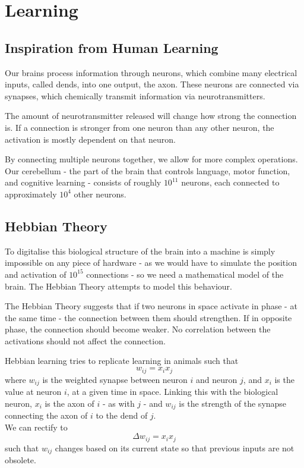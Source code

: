 \section{Learning} 

\subsection{Inspiration from Human Learning}
\label{human}

Our brains process information through \gls{neuron}s, which combine many electrical inputs, called \gls{dend}s, into one output, the \gls{axon}. These \gls{neuron}s are connected via \gls{synapse}s, which chemically transmit information via neurotransmitters. \cite{brain} 

The amount of neurotransmitter released will change how strong the connection is. If a connection is stronger from one \gls{neuron} than any other \gls{neuron}, the activation is mostly dependent on that \gls{neuron}. 

By connecting multiple \gls{neuron}s together, we allow for more complex operations. Our cerebellum - the part of the brain that controls language, motor function, and cognitive learning - consists of roughly $10^{11}$ \gls{neuron}s, each connected to approximately $10^4$ other \gls{neuron}s.\cite{neuron}

\subsection{Hebbian Theory}
\label{hebb}

To digitalise this biological structure of the brain into a machine is simply impossible on any piece of hardware - as we would have to simulate the position and activation of $10^{15}$ connections - so we need a mathematical \gls{model} of the brain. The Hebbian Theory attempts to \gls{model} this behaviour.

The Hebbian Theory suggests that if two \gls{neuron}s in space activate in phase - at the same time - the connection between them should strengthen. If in opposite phase, the connection should become weaker. No correlation between the activations should not affect the connection.\cite[p.~70]{hebb}

Hebbian learning tries to replicate learning in animals such that 
\begin{equation}
w_{ij}=x_ix_j 
\label{eq:hebb}
\end{equation}
where $w_{ij}$ is the weighted \gls{synapse} between \gls{neuron} $i$ and \gls{neuron} $j$, and $x_i$ is the value at \gls{neuron} $i$, at a given time in space. Linking this with the biological \gls{neuron}, $x_i$ is the \gls{axon} of $i$ - as with $j$ - and $w_{ij}$ is the strength of the \gls{synapse} connecting the \gls{axon} of $i$ to the \gls{dend} of $j$.\\
We can rectify  to 
\begin{equation} 
\Delta w_{ij}=x_ix_j
\label{eq:dhebb}
\end{equation}
such that $w_{ij}$ changes based on its current state so that previous inputs are not obsolete.

